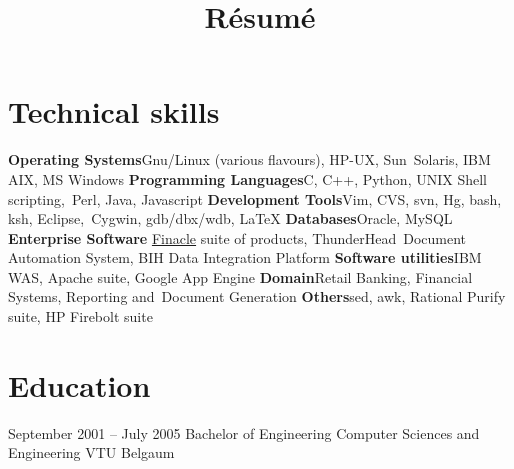 \documentclass[11pt,a4paper,sans]{moderncv}
\title{Résumé}
\begin{document}
\maketitle

\newcommand\colorhref[3][linky]{\href{#2}{\small\color{#1}#3}}

\section{Technical skills}
\cvcomputer
{\textbf{Operating Systems}}{Gnu/Linux (various flavours), HP-UX, Sun\
	Solaris, IBM AIX, MS Windows}
{\textbf{Programming Languages}}{C, C++, Python, UNIX Shell scripting,\
	Perl, Java, Javascript}
\cvcomputer
{\textbf{Development Tools}}{Vim, CVS, svn, Hg, bash, ksh, Eclipse,\
Cygwin, gdb/dbx/wdb, \textrm{\LaTeX}}
{\textbf{Databases}}{Oracle, MySQL}
\cvcomputer
{\textbf{Enterprise Software}}{
	\hypersetup{linkcolor=blue}
	\colorhref{finacle.com}{Finacle} suite of products, ThunderHead\
Document Automation System, BIH Data Integration Platform}
{\textbf{Software utilities}}{IBM WAS, Apache suite, Google App Engine}
\cvcomputer
{\textbf{Domain}}{Retail Banking, Financial Systems, Reporting and\
Document Generation}
{\textbf{Others}}{sed, awk, Rational Purify suite, HP Firebolt suite}
{}{}

\section{Education}

\cventry
{September 2001 -- July 2005}
{Bachelor of Engineering}
{Computer Sciences and Engineering}
{VTU Belgaum}
{}
{} 

\end{document}
